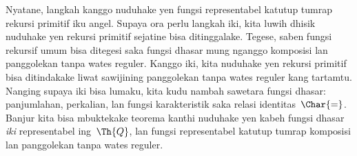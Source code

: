 \documentclass[../../../include/open-logic-section]{subfiles}
\begin{document}
Nyatane, langkah kanggo nuduhake yen fungsi representabel
katutup tumrap rekursi primitif iku angel. Supaya ora perlu
langkah iki, kita luwih dhisik nuduhake yen rekursi primitif
sejatine bisa ditinggalake. Tegese, saben fungsi rekursif umum
bisa ditegesi saka fungsi dhasar mung nganggo komposisi lan
panggolekan tanpa wates reguler. Kanggo iki, kita nuduhake
yen rekursi primitif bisa ditindakake liwat sawijining
panggolekan tanpa wates reguler kang tartamtu. Nanging supaya
iki bisa lumaku, kita kudu nambah sawetara fungsi dhasar:
panjumlahan, perkalian, lan fungsi karakteristik saka relasi
identitas~$\Char{=}$. Banjur kita bisa mbuktekake teorema
kanthi nuduhake yen kabeh fungsi dhasar \emph{iki}
representabel ing~$\Th{Q}$, lan fungsi representabel katutup
tumrap komposisi lan panggolekan tanpa wates reguler.
\end{document}
